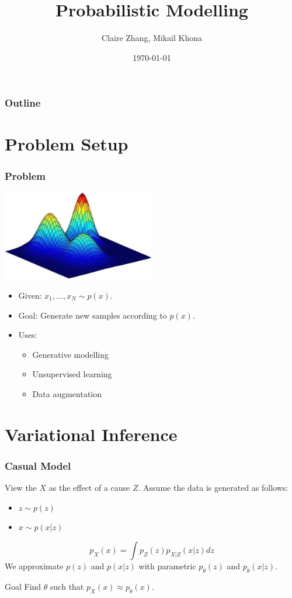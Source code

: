 \documentclass{beamer}
\title{Probabilistic Modelling}
\author{Claire Zhang, Mikail Khona}
\date{\today}
\begin{document}
\begin{frame}
  \titlepage
\end{frame}

\begin{frame}
  \frametitle{Outline}
  \tableofcontents
\end{frame}

\section{Problem Setup}

\begin{frame}
    \frametitle{Problem}
    \begin{center}
        \includegraphics[width=0.5\textwidth]{images/gmix.jpg}
    \end{center}
    \begin{itemize}
    \item Given: $x_1, \ldots, x_N \sim p(x)$.
    \item Goal: Generate new samples according to $p(x)$.
    \item Uses:
        \begin{itemize}
            \item Generative modelling
            \item Unsupervised learning
            \item Data augmentation
        \end{itemize}
    \end{itemize}
\end{frame}

\section{Variational Inference}

\begin{frame}
\frametitle{Casual Model}
View the $X$ as the effect of a cause $Z$. Assume the data is generated as follows:

    \begin{itemize}
    \item $z \sim p(z)$
    \item $x \sim p(x|z)$
    \end{itemize}
    \[p_X(x) = \int p_Z(z) p_{X | Z}(x|z) dz\]
    We approximate $p(z)$ and $p(x|z)$ with parametric $p_{\theta}(z)$ and $p_{\theta}(x|z)$.

    \begin{block}{Goal}
        Find $\theta$ such that $p_X(x) \approx p_{\theta}(x)$.
    \end{block}
\end{frame}
\end{document}
